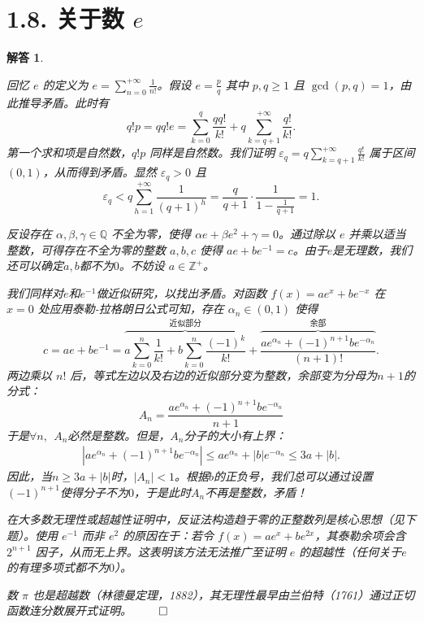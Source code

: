 \documentclass[12pt,UTF8]{ctexbook}
\theoremstyle{exercisestyle}
\theoremstyle{solutionstyle}
\newtheorem*{solution*}{解答}
\newenvironment{solution}
  {\begin{solution*}}
  {\hfill\ensuremath{\qed}\end{solution*}}
\begin{document}
\section{1.8. 关于数 $e$}
\begin{solution}
  \begin{subquestions}
    \item 回忆 $e$ 的定义为 $e = \sum_{n=0}^{+\infty} \frac{1}{n!}$。假设 $e = \frac{p}{q}$ 其中 $p, q \geqslant 1$ 且 $\gcd(p,q) = 1$，由此推导矛盾。此时有
    $$
    q!p = qq!e = \sum_{k=0}^{q} \frac{qq!}{k!} + q \sum_{k=q+1}^{+\infty} \frac{q!}{k!}.
    $$
    第一个求和项是自然数，$q!p$ 同样是自然数。我们证明 $\varepsilon_q = q \sum_{k=q+1}^{+\infty} \frac{q!}{k!}$ 属于区间 $(0,1)$，从而得到矛盾。显然 $\varepsilon_q > 0$ 且
    $$
    \varepsilon_q < q \sum_{h=1}^{+\infty} \frac{1}{(q+1)^h} = \frac{q}{q+1} \cdot \frac{1}{1 - \frac{1}{q+1}} = 1.
    $$
    \item 反设存在 $\alpha, \beta, \gamma \in \mathbb{Q}$ 不全为零，使得 $\alpha e + \beta e^2 + \gamma = 0$。通过除以 $e$ 并乘以适当整数，可得存在不全为零的整数 $a, b, c$ 使得 $ae + be^{-1} = c$。由于$e$是无理数，我们还可以确定$a,b$都不为$0$。不妨设 $a \in \mathbb{Z}^+$。
    
    我们同样对$e$和$e^{-1}$做近似研究，以找出矛盾。对函数 $f(x) = ae^x + be^{-x}$ 在 $x=0$ 处应用泰勒-拉格朗日公式可知，存在 $\alpha_n \in (0,1)$ 使得
    $$
    c = ae + be^{-1} = \overbrace{a \sum_{k=0}^{n} \frac{1}{k!} + b \sum_{k=0}^{n} \frac{(-1)^k}{k!}}^{\text{近似部分}} + \overbrace{\frac{ae^{\alpha_n} + (-1)^{n+1}be^{-\alpha_n}}{(n+1)!}}^{\text{余部}}.
    $$
    两边乘以 $n!$ 后，等式左边以及右边的近似部分变为整数，余部变为分母为$n+1$的分式：
    $$A_n = \frac{ae^{\alpha_n} + (-1)^{n+1}be^{-\alpha_n}}{n+1}$$ 
    于是$\forall n,\;\,A_n$必然是整数。但是，$A_n$分子的大小有上界：
    \begin{align*}
        \left|ae^{\alpha_n} + (-1)^{n+1}be^{-\alpha_n}\right| \leqslant ae^{\alpha_n} + |b|e^{-\alpha_n} \leqslant 3a + |b|.
    \end{align*}
    因此，当$n \geqslant 3a + |b|$时，$|A_n| < 1$。根据$b$的正负号，我们总可以通过设置$(-1)^{n+1}$使得分子不为$0$，于是此时$A_n$不再是整数，矛盾！
  \end{subquestions}
  
  在大多数无理性或超越性证明中，反证法构造趋于零的正整数列是核心思想（见下题）。使用 $e^{-1}$ 而非 $e^2$ 的原因在于：若令 $f(x) = ae^x + be^{2x}$，其泰勒余项会含 $2^{n+1}$ 因子，从而无上界。这表明该方法无法推广至证明 $e$ 的超越性（任何关于$e$的有理多项式都不为$0$）。
  
  数 $\pi$ 也是超越数（林德曼定理，1882），其无理性最早由兰伯特（1761）通过正切函数连分数展开式证明。
\end{solution}
\end{document}
